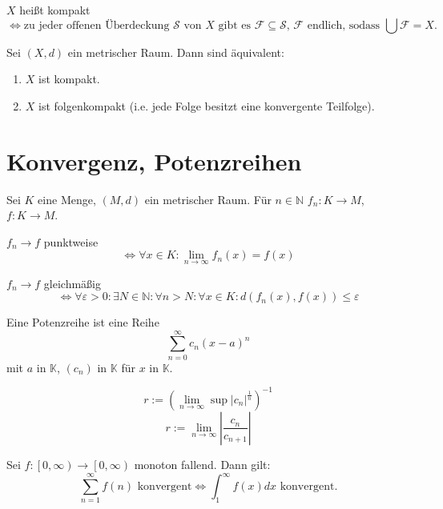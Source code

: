 \documentclass[]{scrartcl}
\newcommand{\N}{\ensuremath{\mathbb{N}}}
\begin{document}
\begin{definition}[Kompaktheit]
$X$ hei\ss t kompakt
\[\Leftrightarrow\text{zu jeder offenen \"Uberdeckung $\mathcal{S}$ von $X$ gibt es $\mathcal{F}\subseteq\mathcal{S}$, $\mathcal{F}$ endlich, sodass $\bigcup\mathcal{F}=X$.}\]
\end{definition}

\begin{satz}
Sei $(X,d)$ ein metrischer Raum. Dann sind \"aquivalent:
\begin{enumerate}
\item $X$ ist kompakt.
\item $X$ ist folgenkompakt (i.e. jede Folge besitzt eine konvergente Teilfolge). 
\end{enumerate}
\end{satz}

\section*{Konvergenz, Potenzreihen}
\begin{definition}[konvergenz]
Sei $K$ eine Menge, $(M,d)$ ein metrischer Raum. F\"ur $n\in\N$ $f_n:K\to M$, $f:K\to M$.

$f_n\to f$ punktweise
\[\Leftrightarrow \forall x\in K : \lim\limits_{n\to\infty}f_n(x)=f(x)\]

$f_n\to f$ gleichm\"a\ss ig
\[\Leftrightarrow \forall \varepsilon>0 : \exists N\in\N:\forall n>N : \forall x\in K: d(f_n(x),f(x))\leq\varepsilon\]
\end{definition}

\begin{definition}[Potenzreihe]
Eine Potenzreihe ist eine Reihe
\[\sum\limits^\infty_{n=0}c_n(x-a)^n\]
mit $a$ in $\mathbb{K}$, $(c_n)$ in $\mathbb{K}$ f\"ur $x$ in $\mathbb{K}$.
\end{definition}

\begin{satz}[Konvergenzradius]
\[r:=(\lim_{n\to\infty}\sup{|c_n|^{\frac{1}{n}}})^{-1}\]
\[r:=\lim_{n\to\infty}\left|\frac{c_n}{c_{n+1}}\right|\]
\end{satz}

\begin{satz}[Integralvergleichskriterium]
Sei $f:\left[0,\infty\right)\to \left[0,\infty\right)$ monoton fallend. Dann gilt:
\[\sum\limits^\infty_{n=1}f(n) \text{ konvergent}\Leftrightarrow \int_{1}^{\infty}f(x) dx\text{ konvergent.}\]
\end{satz}
\end{document}
